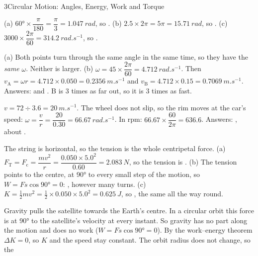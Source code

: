 \begin{chapteranswers}{3}{Circular Motion: Angles, Energy, Work and Torque}
  \item (a) $\ang{60} \times \dfrac{\pi}{180} = \dfrac{\pi}{3} = \qty{1.047}{rad}$, so
        .
        (b) $2.5 \times 2\pi = 5\pi = \qty{15.71}{rad}$, so .
        (c) $3000 \times \dfrac{2\pi}{60} = \qty{314.2}{rad.s^{-1}}$, so
        .
  \item (a) Both points turn through the same angle in the same time, so they have the
        \emph{same} $\omega$. Neither is larger.
        (b) $\omega = 45 \times \dfrac{2\pi}{60} = \qty{4.712}{rad.s^{-1}}$. Then
        $v_\mathrm{A} = \omega r = 4.712 \times 0.050 = \qty{0.2356}{m.s^{-1}}$ and
        $v_\mathrm{B} = 4.712 \times 0.15 = \qty{0.7069}{m.s^{-1}}$.
        Answers:  and
        . B is 3 times as far out, so it is 3 times as fast.
  \item $v = 72 \div 3.6 = \qty{20}{m.s^{-1}}$. The wheel does not slip, so the rim moves at the
        car's speed: $\omega = \dfrac{v}{r} = \dfrac{20}{0.30} = \qty{66.67}{rad.s^{-1}}$.
        In rpm: $66.67 \times \dfrac{60}{2\pi} = 636.6$.
        Answers: , about .
  \item The string is horizontal, so the tension is the whole centripetal force.
        (a) $F_\mathrm{T} = F_\mathrm{c} = \dfrac{mv^2}{r} = \dfrac{0.050 \times 5.0^2}{0.60} =
        \qty{2.083}{N}$, so the tension is .
        (b) The tension points to the centre, at \ang{90} to every small step of the motion, so
        $W = Fs\cos\ang{90} = 0$: , however many turns.
        (c) $K = \tfrac{1}{2}mv^2 = \tfrac{1}{2} \times 0.050 \times 5.0^2 = \qty{0.625}{J}$, so
        , the same all the way round.
  \item Gravity pulls the satellite towards the Earth's centre. In a circular orbit this force is
        at \ang{90} to the satellite's velocity at every instant. So gravity has no part along the
        motion and does no work ($W = Fs\cos\ang{90} = 0$). By the work--energy theorem
        $\Delta K = 0$, so $K$ and the speed stay constant. The orbit radius does not change, so the

\end{chapteranswers}
